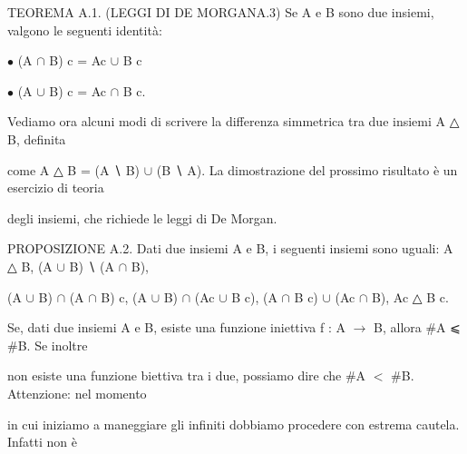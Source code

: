 \documentclass[a4paper,portrait,12pt]{article}
\begin{document}
\begin{flushleft}
TEOREMA A.1. (LEGGI DI DE MORGANA.3) Se A e B sono due insiemi, valgono le seguenti identit\`{a}:
\end{flushleft}


\begin{flushleft}
$\bullet$ (A $\cap$ B) c = Ac $\cup$ B c
\end{flushleft}


\begin{flushleft}
$\bullet$ (A $\cup$ B) c = Ac $\cap$ B c.
\end{flushleft}


\begin{flushleft}
Vediamo ora alcuni modi di scrivere la differenza simmetrica tra due insiemi A △ B, definita
\end{flushleft}


\begin{flushleft}
come A △ B = (A ∖ B) $\cup$ (B ∖ A). La dimostrazione del prossimo risultato \`{e} un esercizio di teoria
\end{flushleft}


\begin{flushleft}
degli insiemi, che richiede le leggi di De Morgan.
\end{flushleft}


\begin{flushleft}
PROPOSIZIONE A.2. Dati due insiemi A e B, i seguenti insiemi sono uguali: A △ B, (A $\cup$ B) ∖ (A $\cap$ B),
\end{flushleft}


\begin{flushleft}
(A $\cup$ B) $\cap$ (A $\cap$ B) c, (A $\cup$ B) $\cap$ (Ac $\cup$ B c), (A $\cap$ B c) $\cup$ (Ac $\cap$ B), Ac △ B c.
\end{flushleft}


\begin{flushleft}
Se, dati due insiemi A e B, esiste una funzione iniettiva f : A $\rightarrow$ B, allora \#A ⩽ \#B. Se inoltre
\end{flushleft}


\begin{flushleft}
non esiste una funzione biettiva tra i due, possiamo dire che \#A $<$ \#B. Attenzione: nel momento
\end{flushleft}


\begin{flushleft}
in cui iniziamo a maneggiare gli infiniti dobbiamo procedere con estrema cautela. Infatti non \`{e}
\end{flushleft}
\end{document}
